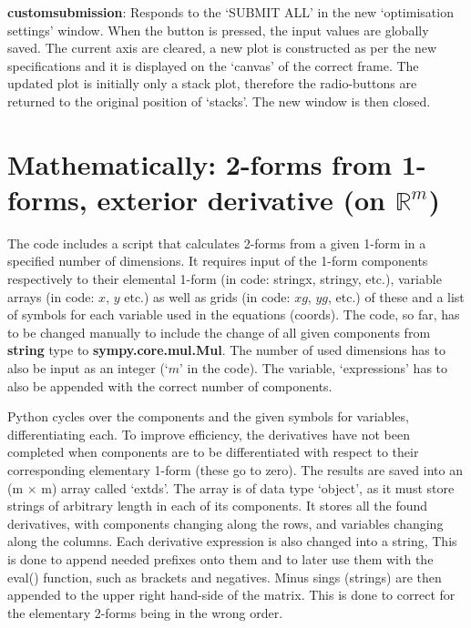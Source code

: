 \documentclass[11]{report}
\begin{document}
\textbf{custom\textunderscore submission}: Responds to the `SUBMIT ALL' in the new `optimisation settings' window. When the button is pressed, the input values are globally saved. The current axis are cleared, a new plot is constructed as per the new specifications and it is displayed on the `canvas' of the correct frame. The updated plot is initially only a stack plot, therefore the radio-buttons are returned to the original position of `stacks'. The new window is then closed.

\section{Mathematically: 2-forms from 1-forms, exterior derivative (on $\mathbb{R}^{m}$)}
The code includes a script that calculates 2-forms from a given 1-form in a specified number of dimensions.
It requires input of the 1-form components respectively to their elemental 1-form (in code: string\textunderscore x, string\textunderscore y, etc.), variable arrays (in code: $x$, $y$ etc.) as well as grids (in code: $xg$, $yg$, etc.) of these and a list of symbols for each variable used in the equations (coords).
The code, so far, has to be changed manually to include the change of all given components from \textbf{string} type to \textbf{sympy.core.mul.Mul}. The number of used dimensions has to also be input as an integer (`$m$' in the code). The variable, `expressions' has to also be appended with the correct number of components.

\noindent Python cycles over the components and the given symbols for variables, differentiating each. To improve efficiency, the derivatives have not been completed when components are to be differentiated with respect to their corresponding elementary 1-form (these go to zero). The results are saved into an (m $\times$ m) array called `ext\textunderscore ds'. The array is of data type `object', as it must store strings of arbitrary length in each of its components. It stores all the found derivatives, with components changing along the rows, and variables changing along the columns.
Each derivative expression is also changed into a string, This is done to append needed prefixes onto them and to later use them with the eval() function, such as brackets and negatives. Minus sings (strings) are then appended to the upper right hand-side of the matrix. This is done to correct for the elementary 2-forms being in the wrong order.
\end{document}
